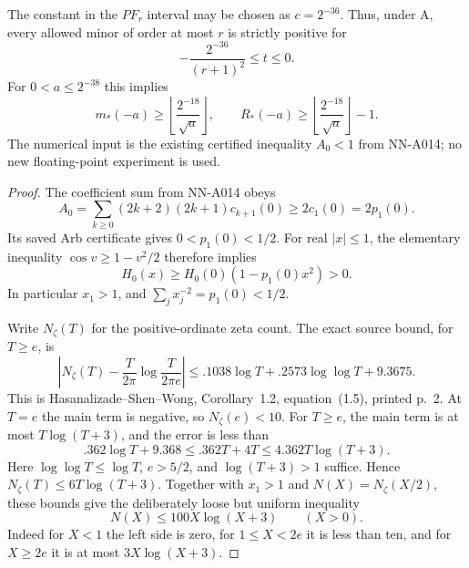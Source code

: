 \begin{corollary}
The constant in the $PF_r$ interval may be chosen as
$c=2^{-36}$. Thus, under A, every allowed minor of order at
most $r$ is strictly positive for
\[
                       -\frac{2^{-36}}{(r+1)^2}\le t\le0.
\]
For $0<a\le2^{-38}$ this implies
\[
 m_*(-a)\ge
       \left\lfloor\frac{2^{-18}}{\sqrt a}\right\rfloor,
 \qquad
 R_*(-a)\ge
       \left\lfloor\frac{2^{-18}}{\sqrt a}\right\rfloor-1.
\]
The numerical input is the existing certified inequality
$A_0<1$ from NN-A014; no new floating-point experiment is used.
\end{corollary}

\begin{proof}
The coefficient sum from NN-A014 obeys
\[
 A_0=\sum_{k\ge0}(2k+2)(2k+1)c_{k+1}(0)
                              \ge2c_1(0)=2p_1(0).
\]
Its saved Arb certificate gives $0<p_1(0)<1/2$. For real
$|x|\le1$, the elementary inequality $\cos v\ge1-v^2/2$
therefore implies
\[
 H_0(x)\ge H_0(0)(1-p_1(0)x^2)>0.
\]
In particular $x_1>1$, and $\sum_jx_j^{-2}=p_1(0)<1/2$.

Write $N_\zeta(T)$ for the positive-ordinate zeta count.
The exact source bound, for $T\ge e$, is
\[
 \left|N_\zeta(T)-\frac{T}{2\pi}
                      \log\frac{T}{2\pi e}\right|
       \le .1038\log T+.2573\log\log T+9.3675.
\]
This is Hasanalizade--Shen--Wong, Corollary~1.2,
equation~(1.5), printed p.~2. At $T=e$ the main term is
negative, so $N_\zeta(e)<10$. For $T\ge e$, the main term
is at most $T\log(T+3)$, and the error is less than
\[
 .362\log T+9.368
       \le .362T+4T
       \le4.362T\log(T+3).
\]
Here $\log\log T\le\log T$, $e>5/2$, and
$\log(T+3)>1$ suffice. Hence
$N_\zeta(T)\le6T\log(T+3)$. Together with $x_1>1$ and
$N(X)=N_\zeta(X/2)$, these bounds give the deliberately loose
but uniform inequality
\begin{equation}\label{eq:analytic-explicit-count-100}
                         N(X)\le100X\log(X+3)\qquad(X>0).
\end{equation}
Indeed for $X<1$ the left side is zero, for
$1\le X<2e$ it is less than ten, and for $X\ge2e$
it is at most $3X\log(X+3)$.


\end{proof}

